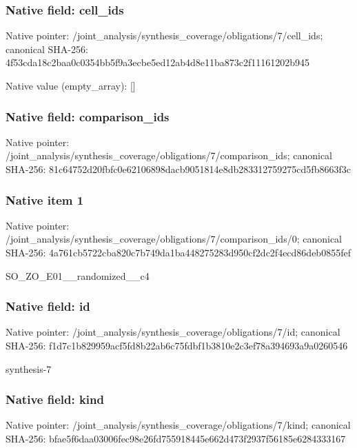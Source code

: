\documentclass[10pt,a4paper]{article}
\begin{document}
\subsubsection{Native field: cell\_\allowbreak{}ids}
Native pointer: /joint\_\allowbreak{}analysis/synthesis\_\allowbreak{}coverage/obligations/7/cell\_\allowbreak{}ids; canonical SHA-256: 4f53cda18c2baa0c0354bb5f9a3ecbe5ed12ab4d8e11ba873c2f11161202b945

Native value (empty\_\allowbreak{}array): []

\subsubsection{Native field: comparison\_\allowbreak{}ids}
Native pointer: /joint\_\allowbreak{}analysis/synthesis\_\allowbreak{}coverage/obligations/7/comparison\_\allowbreak{}ids; canonical SHA-256: 81c64752d20fbfc0e62106898dacb9051814e8db283312759275cd5fb8663f3c

\subsubsection{Native item 1}
Native pointer: /joint\_\allowbreak{}analysis/synthesis\_\allowbreak{}coverage/obligations/7/comparison\_\allowbreak{}ids/0; canonical SHA-256: 4a761cb5722cba820c7b749da1ba448275283d950cf2dc2f4ecd86deb0855fef

\begingroup\raggedright\sloppy SO\_\allowbreak{}ZO\_\allowbreak{}E01\_\allowbreak{}\_\allowbreak{}randomized\_\allowbreak{}\_\allowbreak{}c4\par\endgroup

\subsubsection{Native field: id}
Native pointer: /joint\_\allowbreak{}analysis/synthesis\_\allowbreak{}coverage/obligations/7/id; canonical SHA-256: f1d7c1b829959acf5fd8b22ab6c75fdbf1b3810e2c3ef78a394693a9a0260546

\begingroup\raggedright\sloppy synthesis-7\par\endgroup

\subsubsection{Native field: kind}
Native pointer: /joint\_\allowbreak{}analysis/synthesis\_\allowbreak{}coverage/obligations/7/kind; canonical SHA-256: bfae5f6daa03006fec98e26fd755918445e662d473f2937f56185e6284333167
\end{document}
